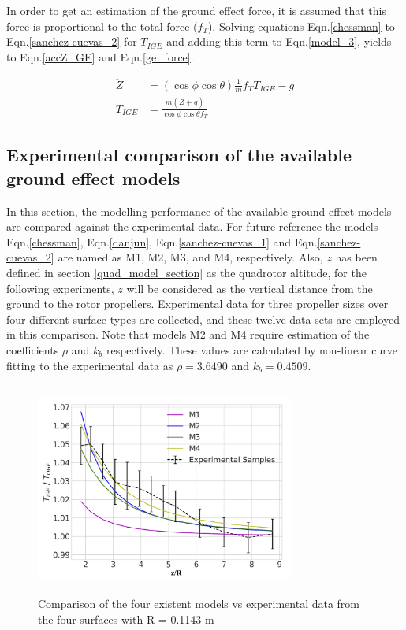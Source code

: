 \documentclass[twocolumn,10pt]{asme2ej}
\begin{document}
In order to get an estimation of the ground effect force, it is assumed that this force is proportional to the total force ($f_{T}$). Solving equations Eqn.\eqref{chessman} to Eqn.\eqref{sanchez-cuevas_2} for $T_{IGE}$ and adding this term to Eqn.\eqref{model_3}, yields to Eqn.\eqref{accZ_GE} and Eqn.\eqref{ge_force}.

\begin{align}
  \ddot{Z} &= (\cos\phi\cos\theta)\frac{1}{m}f_{T}T_{IGE} - g \label{accZ_GE}\\
  T_{IGE}       &= \frac{m(\ddot{Z} + g)}{\cos\phi\cos\theta f_{T}} \label{ge_force}
\end{align}

\subsection{Experimental comparison of the available ground effect models}
In this section, the modelling performance of the available ground effect models are compared against the experimental data. For future reference the models Eqn.\eqref{chessman}, Eqn.\eqref{danjun}, Eqn.\eqref{sanchez-cuevas_1} and Eqn.\eqref{sanchez-cuevas_2} are named as M1, M2, M3, and M4, respectively. Also, $z$ has been defined in section \ref{quad_model_section} as the quadrotor altitude, for the following experiments, $z$ will be considered as the vertical distance from the ground to the rotor propellers. Experimental data for three propeller sizes over four different surface types are collected, and these twelve data sets are employed in this comparison. Note that models M2 and M4 require estimation of the coefficients $\rho$ and $k_{b}$ respectively. These values are calculated by non-linear curve fitting to the experimental data as $\rho = 3.6490$ and $k_{b} = 0.4509$.

\begin{figure}[t]
    \begin{center}
        \setlength{\unitlength}{0.012500in}%
        \includegraphics[width=8.5cm, height=7cm]{Images/r1sx.png}
    \end{center}
  \caption{Comparison of the four existent models vs experimental data from the four surfaces with R = 0.1143 m}
  \label{r1sx_plot}
\end{figure}
\end{document}
